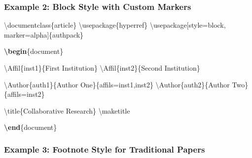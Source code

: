 \documentclass[
]{article}
\newenvironment{Shaded}{}{}
\newcommand{\BuiltInTok}[1]{#1}
\newcommand{\ExtensionTok}[1]{#1}
\newcommand{\FunctionTok}[1]{\textcolor[rgb]{0.02,0.16,0.49}{#1}}
\newcommand{\KeywordTok}[1]{\textcolor[rgb]{0.00,0.44,0.13}{\textbf{#1}}}
\newcommand{\NormalTok}[1]{#1}
\begin{document}
\hypertarget{example-2-block-style-with-custom-markers}{%
\subsubsection{Example 2: Block Style with Custom
Markers}\label{example-2-block-style-with-custom-markers}}

\begin{Shaded}
\begin{Highlighting}[]
\BuiltInTok{\textbackslash{}documentclass}\NormalTok{\{}\ExtensionTok{article}\NormalTok{\}}
\BuiltInTok{\textbackslash{}usepackage}\NormalTok{\{}\ExtensionTok{hyperref}\NormalTok{\}}
\BuiltInTok{\textbackslash{}usepackage}\NormalTok{[style=block, marker=alpha]\{}\ExtensionTok{authpack}\NormalTok{\}}

\KeywordTok{\textbackslash{}begin}\NormalTok{\{}\ExtensionTok{document}\NormalTok{\}}

\FunctionTok{\textbackslash{}Affil}\NormalTok{\{inst1\}\{First Institution\}}
\FunctionTok{\textbackslash{}Affil}\NormalTok{\{inst2\}\{Second Institution\}}

\FunctionTok{\textbackslash{}Author}\NormalTok{\{auth1\}\{Author One\}\{affils=inst1,inst2\}}
\FunctionTok{\textbackslash{}Author}\NormalTok{\{auth2\}\{Author Two\}\{affils=inst2\}}

\FunctionTok{\textbackslash{}title}\NormalTok{\{Collaborative Research\}}
\FunctionTok{\textbackslash{}maketitle}

\KeywordTok{\textbackslash{}end}\NormalTok{\{}\ExtensionTok{document}\NormalTok{\}}
\end{Highlighting}
\end{Shaded}

\hypertarget{example-3-footnote-style-for-traditional-papers}{%
\subsubsection{Example 3: Footnote Style for Traditional
Papers}\label{example-3-footnote-style-for-traditional-papers}}
\end{document}
